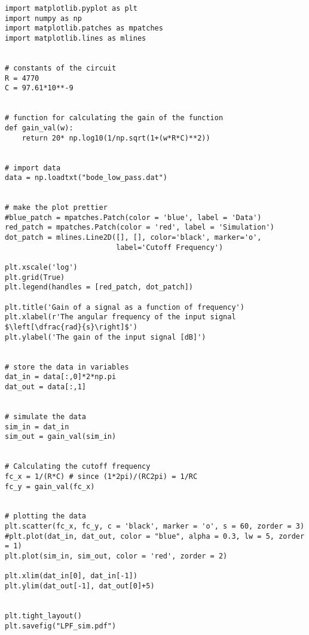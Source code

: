 \begin{verbatim}
import matplotlib.pyplot as plt
import numpy as np
import matplotlib.patches as mpatches
import matplotlib.lines as mlines


# constants of the circuit
R = 4770
C = 97.61*10**-9


# function for calculating the gain of the function
def gain_val(w):
    return 20* np.log10(1/np.sqrt(1+(w*R*C)**2))


# import data
data = np.loadtxt("bode_low_pass.dat")


# make the plot prettier
#blue_patch = mpatches.Patch(color = 'blue', label = 'Data')
red_patch = mpatches.Patch(color = 'red', label = 'Simulation')
dot_patch = mlines.Line2D([], [], color='black', marker='o',
                          label='Cutoff Frequency')

plt.xscale('log')
plt.grid(True)
plt.legend(handles = [red_patch, dot_patch])

plt.title('Gain of a signal as a function of frequency')    
plt.xlabel(r'The angular frequency of the input signal $\left[\dfrac{rad}{s}\right]$')
plt.ylabel('The gain of the input signal [dB]')


# store the data in variables
dat_in = data[:,0]*2*np.pi
dat_out = data[:,1]


# simulate the data
sim_in = dat_in
sim_out = gain_val(sim_in)


# Calculating the cutoff frequency
fc_x = 1/(R*C) # since (1*2pi)/(RC2pi) = 1/RC
fc_y = gain_val(fc_x)


# plotting the data
plt.scatter(fc_x, fc_y, c = 'black', marker = 'o', s = 60, zorder = 3)
#plt.plot(dat_in, dat_out, color = "blue", alpha = 0.3, lw = 5, zorder = 1)
plt.plot(sim_in, sim_out, color = 'red', zorder = 2)

plt.xlim(dat_in[0], dat_in[-1])
plt.ylim(dat_out[-1], dat_out[0]+5)


plt.tight_layout()
plt.savefig("LPF_sim.pdf")

\end{verbatim}
